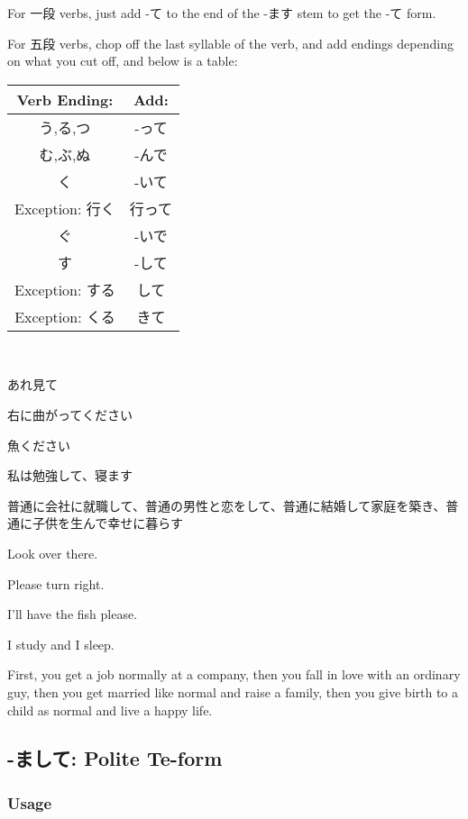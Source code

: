 \documentclass{article}
\begin{document}
\begin{CJK}{UTF8}{min}
For 一段 verbs, just add -て to the end of the -ます stem to get the -て form. 

For 五段 verbs, chop off the last syllable of the verb, and add endings depending on what you cut off, and below is a table:

\begin{tabular}{| c | c |}
\hline
Verb Ending: & Add:\\
\hline\hline
う,る,つ & -って\\
む,ぶ,ぬ & -んで\\
く & -いて\\
Exception: 行く & 行って\\
ぐ & -いで\\
す & -して\\
Exception: する & して\\
Exception: くる & きて\\
\hline
\end{tabular}

\begin{example}
    \ 

あれ見て

右に曲がってください

魚ください

私は勉強して、寝ます

普通に会社に就職して、普通の男性と恋をして、普通に結婚して家庭を築き、普通に子供を生んで幸せに暮らす
\end{example}

\begin{solution}
Look over there.

Please turn right.

I'll have the fish please.

I study and I sleep.

First, you get a job normally at a company, then you fall in love with an ordinary guy, then you get married like normal and raise a family, then you give birth to a child as normal and live a happy life.
\end{solution}

\subsection{-まして: Polite Te-form}

\subsubsection{Usage}


\end{CJK}
\end{document}
